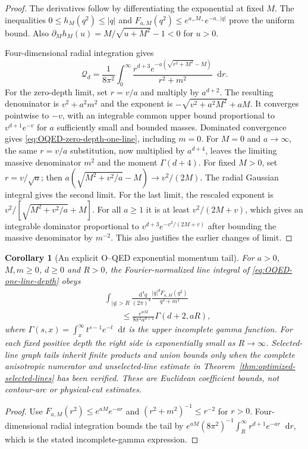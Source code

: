 \documentclass[final,5p,times,twocolumn,numbers,nopreprintline]{elsarticle}
\numberwithin{equation}{section}
\newtheorem{corollary}[theorem]{Corollary}
\theoremstyle{definition}
\theoremstyle{remark}
\newcommand{\dd}{\mathop{}\!\mathrm d}
\begin{document}
\begin{proof}
The derivatives follow by differentiating the exponential at fixed
$M$. The inequalities
$0\leq h_M(q^2)\leq|q|$ and
$F_{a,M}(q^2)\leq e^{a_+M_+}e^{-a_-|q|}$ prove the uniform bound.
Also $\partial_Mh_M(u)=M/\sqrt{u+M^2}-1<0$ for $u>0$.

Four-dimensional radial integration gives
\[
 \mathscr Q_d=\frac1{8\pi^2}\int_0^\infty
 \frac{r^{d+3}e^{-a(\sqrt{r^2+M^2}-M)}}{r^2+m^2}\dd r.
\]
For the zero-depth limit, set $r=v/a$ and multiply by $a^{d+2}$.
The resulting denominator is $v^2+a^2m^2$ and the exponent is
$-\sqrt{v^2+a^2M^2}+aM$. It converges pointwise to $-v$, with
an integrable common upper bound proportional to
$v^{d+1}e^{-v}$ for $a$ sufficiently small and bounded masses.
Dominated convergence gives \eqref{eq:OQED-zero-depth-one-line},
including $m=0$. For $M=0$ and $a\to\infty$, the same $r=v/a$
substitution, now multiplied by $a^{d+4}$, leaves the limiting
massive denominator $m^2$ and the moment $\Gamma(d+4)$.
For fixed $M>0$, set $r=v/\sqrt a$; then
$a(\sqrt{M^2+v^2/a}-M)\to v^2/(2M)$.
The radial Gaussian integral gives the second limit.
For the last limit, the rescaled exponent is
$v^2/[\sqrt{M^2+v^2/a}+M]$. For all $a\geq1$ it is
at least $v^2/(2M+v)$, which gives an integrable dominator
proportional to $v^{d+3}e^{-v^2/(2M+v)}$ after bounding the
massive denominator by $m^{-2}$. This also justifies the earlier
changes of limit.
\end{proof}


\begin{corollary}[An explicit O--QED exponential momentum tail]
\label{cor:OQED-exponential-line-tail}
For $a>0$, $M,m\geq0$, $d\geq0$ and $R>0$, the
Fourier-normalized line integral of
\eqref{eq:OQED-one-line-depth} obeys
\begin{equation}
 \begin{aligned}
 &\int_{|q|>R}\frac{\dd^4q}{(2\pi)^4}
     \frac{|q|^dF_{a,M}(q^2)}{q^2+m^2}\\
 &\qquad\leq \frac{e^{aM}}{8\pi^2a^{d+2}}
                     \Gamma(d+2,aR),
 \end{aligned}
 \label{eq:OQED-exponential-line-tail}
\end{equation}
where $\Gamma(s,x)=\int_x^\infty
 t^{s-1}e^{-t}\dd t$ is the upper incomplete gamma
function. For each fixed positive depth the right side is
exponentially small as $R\to\infty$. Selected-line graph tails
inherit finite products and union bounds only when the
\emph{complete} anisotropic numerator and unselected-line
estimate in Theorem~\ref{thm:optimized-selected-lines}
has been verified. These are Euclidean coefficient bounds,
not contour-arc or physical-cut estimates.
\end{corollary}
\begin{proof}
Use $F_{a,M}(r^2)\leq e^{aM}e^{-ar}$ and
$(r^2+m^2)^{-1}\leq r^{-2}$ for $r>0$. Four-dimensional
radial integration bounds the tail by
$e^{aM}(8\pi^2)^{-1}\int_R^\infty r^{d+1}e^{-ar}\dd r$,
which is the stated incomplete-gamma expression.
\end{proof}
\end{document}
